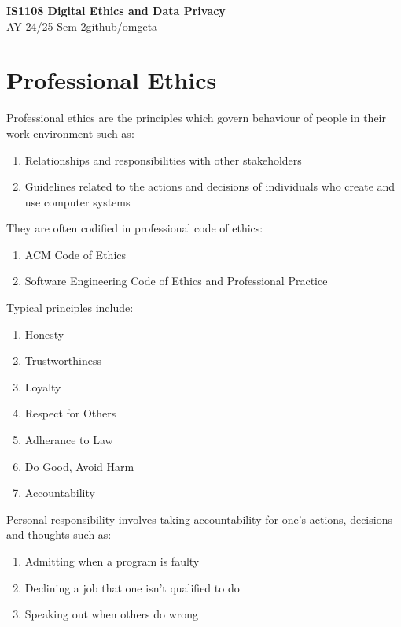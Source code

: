 \documentclass[12pt, a4paper]{article}
\newcommand{\mytitle}{IS1108 Digital Ethics and Data Privacy}
\newcommand{\myauthor}{github/omgeta}
\newcommand{\mydate}{AY 24/25 Sem 2}
\begin{document}
\raggedright
\footnotesize
\begin{multicols*}{3}
\setlength{\premulticols}{1pt}
\setlength{\postmulticols}{1pt}
\setlength{\multicolsep}{1pt}
\setlength{\columnsep}{2pt}

{\normalsize{\textbf{\mytitle}}} \\
{\footnotesize{\mydate\hspace{2pt}\textemdash\hspace{2pt}\myauthor}}

\section{Professional Ethics}

Professional ethics are the principles which govern behaviour of people in their work environment such as:
\begin{enumerate}[\roman*.]
  \item Relationships and responsibilities with other stakeholders
  \item Guidelines related to the actions and decisions of individuals who create and use computer systems 
\end{enumerate}

They are often codified in professional code of ethics:
\begin{enumerate}[\roman*.]
  \item ACM Code of Ethics
  \item Software Engineering Code of Ethics and Professional Practice
\end{enumerate}

Typical principles include:
\begin{enumerate}[\roman*.]
  \item Honesty
  \item Trustworthiness
  \item Loyalty
  \item Respect for Others
  \item Adherance to Law
  \item Do Good, Avoid Harm
  \item Accountability
\end{enumerate}

Personal responsibility involves taking accountability for one's actions, decisions and thoughts such as:
\begin{enumerate}[\roman*.]
  \item Admitting when a program is faulty
  \item Declining a job that one isn't qualified to do 
  \item Speaking out when others do wrong
\end{enumerate}


\end{multicols*}
\end{document}
